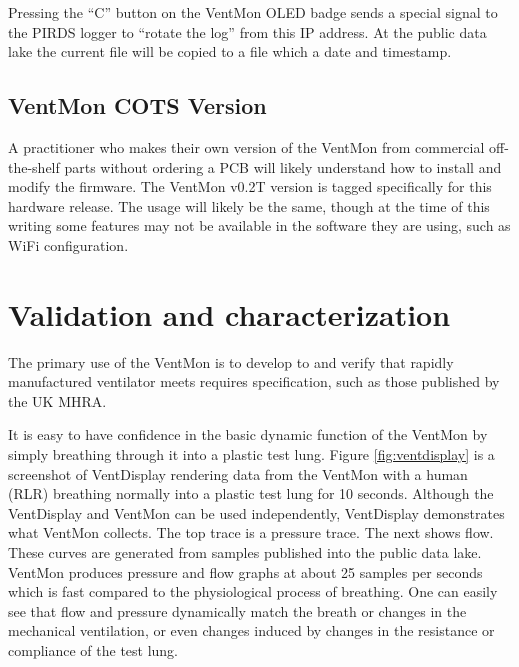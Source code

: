 \documentclass[11pt, letterpaper]{article}
\begin{document}
Pressing the ``C'' button on the VentMon OLED badge sends a special signal to the PIRDS logger to ``rotate the log'' from this IP address. At the public data lake the current file will be copied to a file which a date and timestamp.

\subsection{VentMon COTS Version}

A practitioner who makes their own version of the VentMon from commercial off-the-shelf parts without ordering a PCB will likely understand how to install
and modify the firmware. The VentMon v0.2T\cite{VentMon02} version is tagged specifically for this hardware release. The usage will likely be the same, though at the time of this writing some features
may not be available in the software they are using, such as WiFi configuration.

\section{Validation and characterization}


The primary use of the VentMon is to develop to and verify that rapidly manufactured ventilator meets requires specification, such as those published by the UK MHRA\cite{mhra2020specification}.

It is easy to have confidence in the basic dynamic function of the VentMon by simply breathing through it into a plastic test lung. Figure \ref{fig:ventdisplay} is a screenshot of VentDisplay rendering data from the VentMon with a human (RLR) breathing normally into a plastic test lung for 10 seconds. Although the VentDisplay and VentMon can be used independently, VentDisplay demonstrates what VentMon collects. The top trace is a pressure trace. The next shows flow. These curves are generated from samples published into the public data lake. VentMon produces pressure and flow graphs at about 25 samples per seconds which is fast compared to the physiological process of breathing. One can easily see that flow and pressure dynamically match the breath or changes in the mechanical ventilation, or even changes induced by changes in the resistance or compliance of the test lung.
\end{document}
